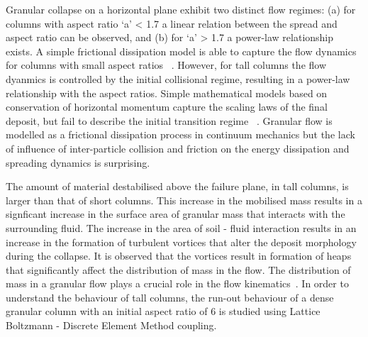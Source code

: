 \documentclass[epj,twocolumn]{webofc}
\begin{document}
Granular collapse on a horizontal plane exhibit two distinct flow regimes:
(a) for columns with aspect ratio ‘a’ < 1.7 a linear relation between the
spread and aspect ratio can be observed, and (b) for ‘a’ > 1.7 a power-law
relationship exists. A simple frictional dissipation model is able to
capture the flow dynamics for columns with small aspect ratios
~\cite{soundararajan2015}. However, for tall columns the flow
dyanmics is controlled by the initial collisional regime, resulting in a
power-law relationship with the aspect ratios. Simple mathematical models
based on conservation of horizontal momentum capture the scaling laws of
the final deposit, but fail to describe the initial transition regime
~\cite{Kumar2012}. Granular flow is modelled as a frictional dissipation
process in continuum mechanics but the lack of influence of inter-particle
collision and friction on the energy dissipation and spreading dynamics is
surprising.

The amount of material destabilised above the failure plane, in tall columns,
is larger than that of short columns. This increase in the mobilised mass
results in a signficant increase in the surface area of granular mass that
interacts with the surrounding fluid. The increase in the area of soil -
fluid interaction results in an increase
in the formation of turbulent vortices that alter the deposit morphology during 
the collapse. It is observed that the vortices result in formation of heaps 
that significantly affect the distribution of mass in the flow.
The distribution of mass in a granular flow plays a crucial role in the
flow kinematics~\cite{Staron2007a}. In order to understand the
behaviour of tall columns, the run-out behaviour of a dense granular column
with an initial aspect ratio of 6 is studied using Lattice Boltzmann - Discrete
Element Method coupling.
\end{document}
